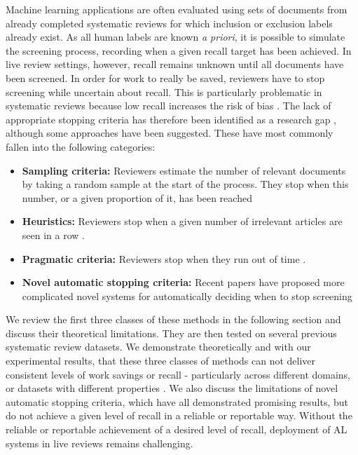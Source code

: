 \documentclass{bmcart}
\begin{document}
	Machine learning applications are often evaluated using sets of documents from already completed systematic reviews for which inclusion or exclusion labels already exist. 
	As all human labels are known \textit{a priori}, it is possible to simulate the screening process, recording when a given recall target has been achieved.
	In live review settings, however, recall remains unknown until all documents have been screened. 
	In order for work to really be saved, reviewers have to stop screening while uncertain about recall. 
	This is particularly problematic in systematic reviews because low recall increases the risk of bias \cite{Lefebvre2011}.
	The lack of appropriate stopping criteria has therefore been identified as a research gap \cite{bannach-brown2019, Marshall2019}, although some approaches have been suggested. These have most commonly fallen into the following categories:
	\begin{itemize}
		\item \textbf{Sampling criteria:} Reviewers estimate the number of relevant documents by taking a random sample at the start of the process. They stop when this number, or a given proportion of it, has been reached \cite{Shemilt2014}
		\item \textbf{Heuristics:} Reviewers stop when a given number of irrelevant articles are seen in a row \cite{Jonnalagadda2013, Przybya2018}. 
		\item \textbf{Pragmatic criteria:} Reviewers stop when they run out of time \cite{miwa2014}. 
		\item \textbf{Novel automatic stopping criteria:} Recent papers have proposed more complicated novel systems for automatically deciding when to stop screening \cite{Yu2019, DiNunzio2018, Howard2020}
	\end{itemize}
	
	
	We review the first three classes of these methods in the following section and discuss their theoretical limitations. They are then tested on several previous systematic review datasets.
	We demonstrate theoretically and with our experimental results, that these three classes of methods can not deliver consistent levels of work savings or recall - particularly across different domains, or datasets with different properties \cite{OMara-Eves2015}. We also discuss the limitations of novel automatic stopping criteria, which have all demonstrated promising results, but do not achieve a given level of recall in a reliable or reportable way.   
	Without the reliable or reportable achievement of a desired level of recall, deployment of AL systems in live reviews remains challenging.
	
\end{document}
